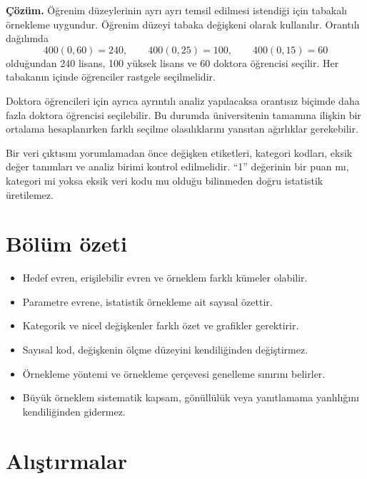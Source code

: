\textbf{Çözüm.} Öğrenim düzeylerinin ayrı ayrı temsil edilmesi istendiği için
tabakalı örnekleme uygundur. Öğrenim düzeyi tabaka değişkeni olarak kullanılır.
Orantılı dağılımda
\[
400(0{,}60)=240,\qquad
400(0{,}25)=100,\qquad
400(0{,}15)=60
\]
olduğundan 240 lisans, 100 yüksek lisans ve 60 doktora öğrencisi seçilir.
Her tabakanın içinde öğrenciler rastgele seçilmelidir.

Doktora öğrencileri için ayrıca ayrıntılı analiz yapılacaksa orantısız biçimde
daha fazla doktora öğrencisi seçilebilir. Bu durumda üniversitenin tamamına
ilişkin bir ortalama hesaplanırken farklı seçilme olasılıklarını yansıtan
ağırlıklar gerekebilir.

\begin{outputguidebox}
Bir veri çıktısını yorumlamadan önce değişken etiketleri, kategori kodları,
eksik değer tanımları ve analiz birimi kontrol edilmelidir. ``1'' değerinin
bir puan mı, kategori mi yoksa eksik veri kodu mu olduğu bilinmeden doğru
istatistik üretilemez.
\end{outputguidebox}





\section{Bölüm özeti}

\begin{itemize}
  \item Hedef evren, erişilebilir evren ve örneklem farklı kümeler olabilir.
  \item Parametre evrene, istatistik örnekleme ait sayısal özettir.
  \item Kategorik ve nicel değişkenler farklı özet ve grafikler gerektirir.
  \item Sayısal kod, değişkenin ölçme düzeyini kendiliğinden değiştirmez.
  \item Örnekleme yöntemi ve örnekleme çerçevesi genelleme sınırını belirler.
  \item Büyük örneklem sistematik kapsam, gönüllülük veya yanıtlamama
  yanlılığını kendiliğinden gidermez.
\end{itemize}

\section*{Alıştırmalar}

